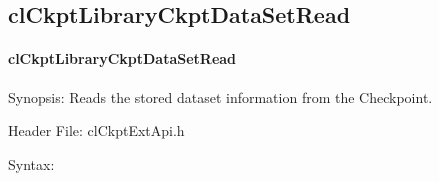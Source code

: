 \begin{flushleft}
\subsection{clCkptLibraryCkptDataSetRead}
\hypertarget{pageckpt208}{}\paragraph{cl\-Ckpt\-Library\-Ckpt\-Data\-Set\-Read}\label{pageckpt208}
\begin{Desc}
\item[Synopsis:]Reads the stored dataset information from the Checkpoint.\end{Desc}
\begin{Desc}
\item[Header File:]clCkptExtApi.h\end{Desc}
\begin{Desc}
\item[Syntax:]


\end{Desc}
\end{flushleft}
